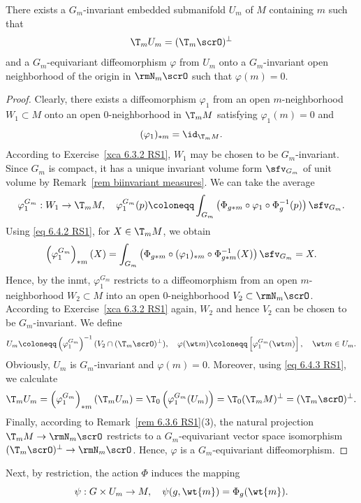 \begin{lem}[{{\cite[Lem.~6.4.4]{RS1}}}]\label{lem 6.4.4 RS1}
    There exists a $G_m$-invariant embedded submanifold $U_m$ of $M$ containing $m$ such that 
    \[\T_mU_m=(\T_m\scrO)^\perp\]
    and a $G_m$-equivariant diffeomorphism $\varphi$ from $U_m$ onto a $G_m$-invariant open neighborhood of the origin in $\rmN_m\scrO$ such that $\varphi(m)=0$.
\end{lem}
\begin{proof}
    Clearly, there exists a diffeomorphism $\varphi_1$ from an open $m$-neighborhood $W_1\subset M$ onto an open $0$-neighborhood in $\T_m M$ satisfying $\varphi_1(m)=0$ and 
    \[(\varphi_1)_{\ast m}=\id_{\T_m M}.\label{eq 6.4.2 RS1}\] According to Exercise~\ref{xca 6.3.2 RS1}, $W_1$ may be chosen to be $G_m$-invariant. Since $G_m$ is compact, it has a unique invariant volume form $\sfv_{G_m}$ of unit volume by Remark~\ref{rem biinvariant measures}. We can take the average 
    \[\varphi_1^{G_m}:W_1\to \T_m M,\quad \varphi_1^{G_m}(p)\coloneqq \int_{G_m}\left(\Phi_{g\ast m}\circ \varphi_1\circ \Phi_{g}^{-1}(p)\right)\sfv_{G_m}.\]
    Using \eqref{eq 6.4.2 RS1}, for $X\in\T_m M$, we obtain 
    \[\left(\varphi_1^{G_m}\right)_{\ast m}(X)=\int_{G_m}\left(\Phi_{g\ast m}\circ (\varphi_1)_{\ast m}\circ \Phi_{g\ast m}^{-1}(X)\right)\sfv_{G_m}=X.\label{eq 6.4.3 RS1}\]
    Hence, by the \gls{inmt}, $\varphi_1^{G_m}$ restricts to a diffeomorphism from an open $m$-neighborhood $W_2\subset M$ into an open $0$-neighborhood $V_2\subset \rmN_m \scrO$. According to Exercise~\ref{xca 6.3.2 RS1} again, $W_2$ and hence $V_2$ can be chosen to be $G_m$-invariant. We define 
    \[U_m\coloneqq \left(\varphi_1^{G_m}\right)^{-1}(V_2\cap (\T_m \scrO)^{\perp}),\quad \varphi(\wt m)\coloneqq \left[\varphi_1^{G_m}(\wt m)\right],\quad \wt m\in U_m.\]
    Obviously, $U_m$ is $G_m$-invariant and $\varphi(m)=0$. Moreover, using \eqref{eq 6.4.3 RS1}, we calculate 
    \[\T_m U_m=\left(\varphi_1^{G_m}\right)_{\ast m}(\T_m U_m)=\T_0\left(\varphi_1^{G_m}(U_m)\right)=\T_0(\T_m M)^\perp=(\T_m \scrO)^\perp.\]
    Finally, according to Remark~\ref{rem 6.3.6 RS1}(3), the natural projection $\T_m M\to \rmN_m \scrO$ restricts to a $G_m$-equivariant vector space isomorphism $(\T_m \scrO)^\perp\to \rmN_m \scrO$. Hence, $\varphi$ is a $G_m$-equivariant diffeomorphism.
\end{proof}

Next, by restriction, the action $\Phi$ induces the mapping
\[\psi:G\times U_m\to M,\quad \psi(g,\wt{m})=\Phi_g(\wt{m}).\]

